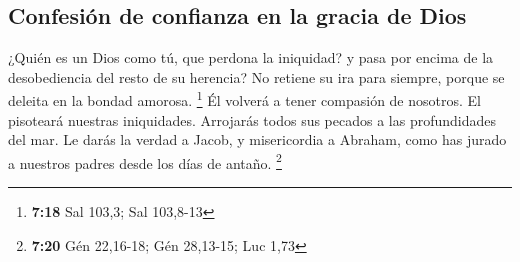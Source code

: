 \hypertarget{confesiuxf3n-de-confianza-en-la-gracia-de-dios}{%
\subsection{Confesión de confianza en la gracia de
Dios}\label{confesiuxf3n-de-confianza-en-la-gracia-de-dios}}

 ¿Quién es un Dios como tú, que perdona la iniquidad? y
pasa por encima de la desobediencia del resto de su herencia? No retiene
su ira para siempre, porque se deleita en la bondad amorosa. \footnote{\textbf{7:18}
  Sal 103,3; Sal 103,8-13}  Él volverá a tener compasión
de nosotros. El pisoteará nuestras iniquidades. Arrojarás todos sus
pecados a las profundidades del mar.  Le darás la verdad
a Jacob, y misericordia a Abraham, como has jurado a nuestros padres
desde los días de antaño. \footnote{\textbf{7:20} Gén 22,16-18; Gén
  28,13-15; Luc 1,73}
